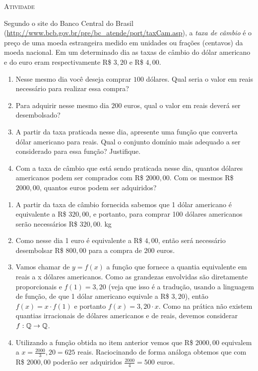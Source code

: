\documentclass[10 pt,usenames,dvipsnames, oneside]{article}
\begin{document}
\bigskip
\begin{center}
{\large \scshape Atividade}
\end{center}
\fi

Segundo o site do Banco Central do Brasil (\url{http://www.bcb.gov.br/pre/bc\_atende/port/taxCam.asp}), a \emph{taxa de câmbio} é o preço de uma moeda estrangeira medido em unidades ou frações (centavos) da moeda nacional. Em um determinado dia as taxas de câmbio do dólar americano e do euro eram respectivamente R\$ $3{,}20$ e R\$ $4{,}00$.
\begin{enumerate}
\item {} 
Nesse mesmo dia você deseja comprar \(100\) dólares. Qual seria o valor em reais necessário para realizar essa compra?

\item {} 
Para adquirir nesse mesmo dia \(200\) euros, qual o valor em reais deverá ser desembolsado?

\item {} 
A partir da taxa praticada nesse dia, apresente uma função que converta dólar americano para reais. Qual o conjunto domínio mais adequado a ser considerado para essa função? Justifique.

\item {} 
Com a taxa de câmbio que está sendo praticada nesse dia, quantos dólares americanos podem ser comprados com R\$ $2000{,}00$. Com os mesmos R\$ $2000{,}00$, quantos euros podem ser adquiridos?

\end{enumerate}

\ifdefined\prof
\begin{solucao}
\begin{enumerate}

\item A partir da taxa de câmbio fornecida sabemos que 1 dólar americano é equivalente a R\$ $320{,}00$, e portanto, para comprar 100 dólares americanos serão necessários R\$ $320{,}00$. \si{kg}

\item Como nesse dia 1 euro é equivalente a R\$ $4{,}00$, então será necessário desembolsar R\$ $800{,}00$ para a compra de $200$ euros.

\item Vamos chamar de $y=f(x)$ a função que fornece a quantia equivalente em reais a x dólares americanos. Como as grandezas envolvidas são diretamente proporcionais e $f(1)=3{,}20$ (veja que isso é a tradução, usando a linguagem de função, de que 1 dólar americano equivale a R\$ $3{,}20$), então $f(x)=x\cdot f(1)$ e portanto $f(x)=3{,}20\cdot x$. Como na prática não existem quantias irracionais de dólares americanos e de reais, devemos considerar $f:\mathbb{Q}\rightarrow\mathbb{Q}$.

\item Utilizando a função obtida no item anterior vemos que R\$ $2000,00$ equivalem a $x\displaystyle=\frac{2000}{3}{,}20=625$ reais. Raciocinando de forma análoga obtemos que com R\$ $2000{,}00$ poderão ser adquiridos $\displaystyle\frac{2000}{4}=500$ euros.
\end{enumerate}
\end{solucao}
\fi
\end{document}
